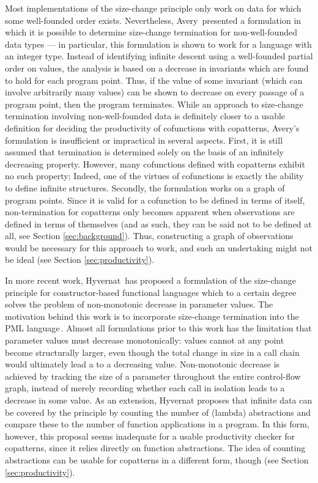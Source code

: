 Most implementations of the size-change principle only work on data for which some well-founded order exists. Nevertheless, Avery\,\citep{Avery06} presented a formulation in which it is possible to determine size-change termination for non-well-founded data types --- in particular, this formulation is shown to work for a language with an integer type. Instead of identifying infinite descent using a well-founded partial order on values, the analysis is based on a decrease in invariants which are found to hold for each program point. Thus, if the value of some invariant (which can involve arbitrarily many values) can be shown to decrease on every passage of a program point, then the program terminates. While an approach to size-change termination involving non-well-founded data is definitely closer to a usable definition for deciding the productivity of cofunctions with copatterns, Avery's formulation is insufficient or impractical in several aspects. First, it is still assumed that termination is determined solely on the basis of an infinitely decreasing property. However, many cofunctions defined with copatterns exhibit no such property; Indeed, one of the virtues of cofunctions is exactly the ability to define infinite structures. Secondly, the formulation works on a graph of program points. Since it is valid for a cofunction to be defined in terms of itself, non-termination for copatterns only becomes apparent when observations are defined in terms of themselves (and as such, they can be said not to be defined at all, see Section \ref{sec:background}). Thus, constructing a graph of observations would be necessary for this approach to work, and such an undertaking might not be ideal (see Section \ref{sec:productivity}).

In more recent work, Hyvernat\,\citep{Hyvernat13} has proposed a formulation of the size-change principle for constructor-based functional languages which to a certain degree solves the problem of non-monotonic decrease in parameter values. The motivation behind this work is to incorporate size-change termination into the PML language\,\cite{PMLLanguage}. Almost all formulations prior to this work has the limitation that parameter values must decrease monotonically: values cannot at any point become structurally larger, even though the total change in size in a call chain would ultimately lead a to a decreasing value. Non-monotonic decrease is achieved by tracking the size of a parameter throughout the entire control-flow graph, instead of merely recording whether each call in isolation leads to a decrease in some value. As an extension, Hyvernat proposes that infinite data can be covered by the principle by counting the number of (lambda) abstractions and compare these to the number of function applications in a program. In this form, however, this proposal seems inadequate for a usable productivity checker for copatterns, since it relies directly on function abstractions. The idea of counting abstractions can be usable for copatterns in a different form, though (see Section \ref{sec:productivity}).

